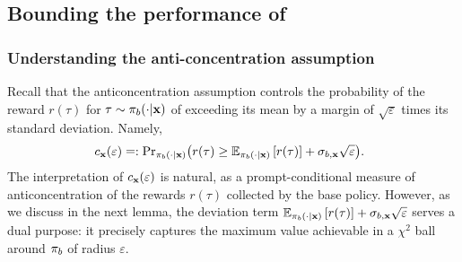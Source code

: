 































\subsection{Bounding the performance of }
\label{subsec:proof-verifier-based-thm}

\subsubsection{Understanding the anti-concentration assumption}

Recall that the anticoncentration assumption controls the probability of the reward $r(\tau)$ for $\tau \sim \pi_b(\cdot|\mathbf{x})$ of exceeding its mean by a margin of $\sqrt{\varepsilon}$ times its standard deviation. Namely,
{
    \setlength{\abovedisplayskip}{5pt}
    \setlength{\abovedisplayskip}{5pt}
    \begin{align*}
    \!\!\!c_{\mathbf{x}} (\varepsilon) \mathrel{\mathop=}: \text{Pr}_{\pi_b(\cdot|\mathbf{x})} \big( r(\tau) \ge \mathbb{E}_{\pi_b(\cdot|\mathbf{x})}\left [ r(\tau) \right ] + \sigma_{b, \mathbf{x}} \sqrt{\varepsilon} \big).
    \end{align*}
}
The interpretation of $c_{\mathbf{x}} (\varepsilon)$ is natural, as a prompt-conditional measure of anticoncentration of the rewards $r(\tau)$ collected by the base policy. However, as we discuss in the next lemma, the deviation term $\mathbb{E}_{\pi_b(\cdot|\mathbf{x})}\left [ r(\tau) \right ] + \sigma_{b, \mathbf{x}} \sqrt{\varepsilon}$ serves a dual purpose: it precisely captures the maximum value achievable in a $\chi^2$ ball around $\pi_b$ of radius $\varepsilon$.

